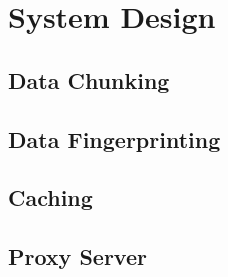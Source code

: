 \section{System Design}
\subsection{Data Chunking}
\subsection{Data Fingerprinting}
\subsection{Caching}
\subsection{Proxy Server}

